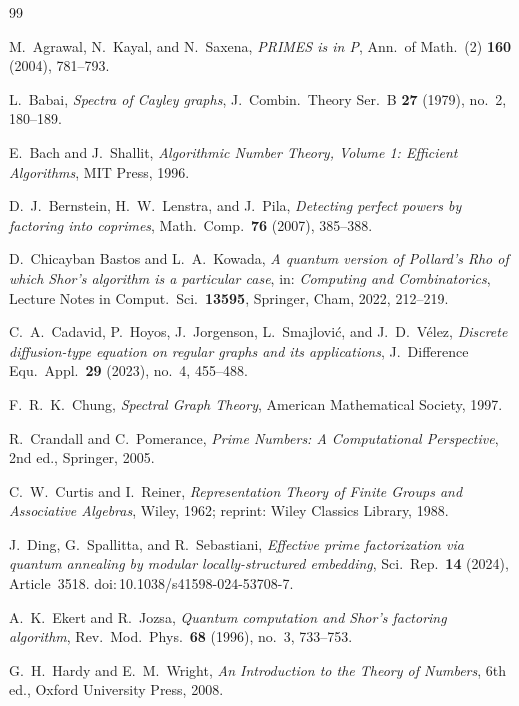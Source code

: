 \documentclass[11pt,reqno]{article}
\numberwithin{equation}{section}
\theoremstyle{plain}
\theoremstyle{definition}
\theoremstyle{remark}
\begin{document}
\begin{thebibliography}{99}



M.~Agrawal, N.~Kayal, and N.~Saxena,
\emph{PRIMES is in P},
Ann.\ of Math.\ (2) \textbf{160} (2004), 781--793.

L.~Babai,
\emph{Spectra of Cayley graphs},
J.\ Combin.\ Theory Ser.\ B \textbf{27} (1979), no.~2, 180--189.

E.~Bach and J.~Shallit,
\emph{Algorithmic Number Theory, Volume 1: Efficient Algorithms},
MIT Press, 1996.

D.~J.~Bernstein, H.~W.~Lenstra, and J.~Pila,
\emph{Detecting perfect powers by factoring into coprimes},
Math.\ Comp.\ \textbf{76} (2007), 385--388.

D.~Chicayban Bastos and L.~A.~Kowada,
\emph{A quantum version of Pollard's Rho of which Shor's algorithm is a particular case},
in: \emph{Computing and Combinatorics},
Lecture Notes in Comput.\ Sci.\ \textbf{13595}, Springer, Cham, 2022, 212--219.

C.~A.~Cadavid, P.~Hoyos, J.~Jorgenson, L.~Smajlovi\'c, and J.~D.~V\'elez,
\emph{Discrete diffusion-type equation on regular graphs and its applications},
J.\ Difference Equ.\ Appl.\ \textbf{29} (2023), no.~4, 455--488.

F.~R.~K.~Chung,
\emph{Spectral Graph Theory},
American Mathematical Society, 1997.

R.~Crandall and C.~Pomerance,
\emph{Prime Numbers: A Computational Perspective},
2nd ed., Springer, 2005.

C.~W.~Curtis and I.~Reiner,
\emph{Representation Theory of Finite Groups and Associative Algebras},
Wiley, 1962; reprint: Wiley Classics Library, 1988.

J.~Ding, G.~Spallitta, and R.~Sebastiani,
\emph{Effective prime factorization via quantum annealing by modular locally-structured embedding},
Sci.\ Rep.\ \textbf{14} (2024), Article~3518.
doi:\,10.1038/s41598-024-53708-7.

A.~K.~Ekert and R.~Jozsa,
\emph{Quantum computation and Shor's factoring algorithm},
Rev.\ Mod.\ Phys.\ \textbf{68} (1996), no.~3, 733--753.

G.~H.~Hardy and E.~M.~Wright,
\emph{An Introduction to the Theory of Numbers},
6th ed., Oxford University Press, 2008.


\end{thebibliography}
\end{document}
